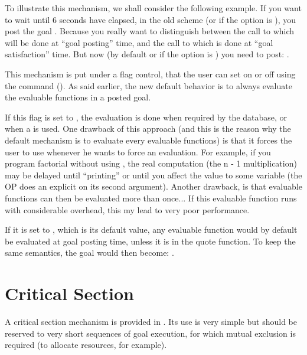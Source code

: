 To illustrate this mechanism, we shall consider the following example. If you
want to wait until 6 seconds have elapsed, in the old scheme (or if the
 option is ), you post the goal . Because you really want to distinguish
between the call to  which will be done at ``goal posting'' time,
and the call to  which is done at ``goal satisfaction'' time.  But
now (by default or if the  option is ) you need to
post: .

This mechanism is put under a flag control, that the user can set on or off
using the command  (). As said earlier, the new default behavior is to always
evaluate the evaluable functions in a posted goal.

If this flag is set to , the evaluation is done when required by the
database, or when a  is used. One drawback of this approach (and
this is the reason why the default mechanism is to evaluate every evaluable
functions) is that it forces the user to use  whenever he wants
to force an evaluation. For example, if you program factorial without using
, the real computation (the n - 1 multiplication) may be
delayed until ``printing'' or until you affect the value to some variable (the
\code{=} OP does an explicit  on its second argument). Another
drawback, is that evaluable functions can then be evaluated more than once...
If this evaluable function runs with considerable overhead, this my lead to very
poor performance.

If it is set to , which is its default value, any evaluable function
would by default be evaluated at goal posting time, unless it is in the quote
function. To keep the same semantics, the goal  would then become: .

\section{Critical Section}

A critical section mechanism is provided in \COPRS{}. Its use is very simple but
should be reserved to very short sequences of goal execution, for which mutual
exclusion is required (to allocate resources, for example).

